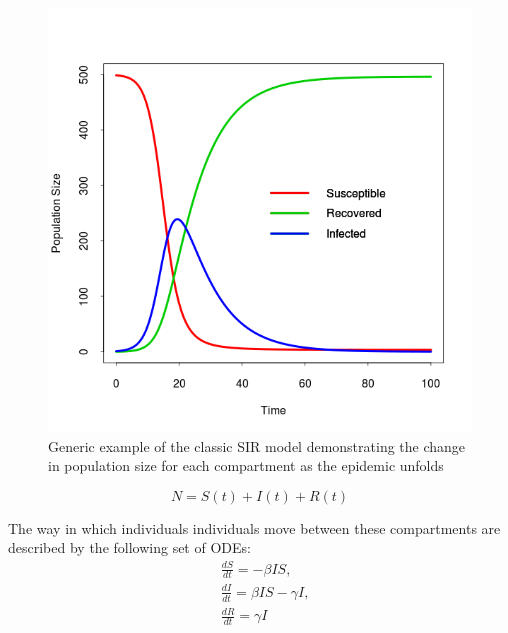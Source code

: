 \begin{figure}[ht!]
\centering
\includegraphics[width=120mm]{Rplot.png}
\caption{Generic example of the classic SIR model demonstrating the change in population size for each compartment as the epidemic unfolds}
\label{sir}
\end{figure}

\begin{equation*}
N = S(t) + I(t) + R(t)
\end{equation*}

The way in which individuals individuals move between these compartments are described by the following set of ODEs:
\begin{equation*}
	\begin{split}
	&\frac{dS}{dt} = -\beta IS, \\
	&\frac{dI}{dt} = \beta IS - \gamma I, \\
	&\frac{dR}{dt} = \gamma I
	\end{split}
\end{equation*}

